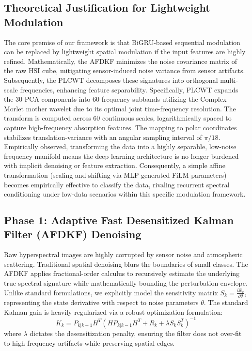 \documentclass[pdflatex,sn-mathphys-num,iicol]{sn-jnl}
\begin{document}
\subsection{Theoretical Justification for Lightweight Modulation}\label{sec:theoretical}
The core premise of our framework is that BiGRU-based sequential modulation can be replaced by lightweight spatial modulation if the input features are highly refined. Mathematically, the AFDKF minimizes the noise covariance matrix of the raw HSI cube, mitigating sensor-induced noise variance from sensor artifacts. Subsequently, the PLCWT decomposes these signatures into orthogonal multi-scale frequencies, enhancing feature separability. Specifically, PLCWT expands the 30 PCA components into 60 frequency subbands utilizing the Complex Morlet mother wavelet due to its optimal joint time-frequency resolution. The transform is computed across 60 continuous scales, logarithmically spaced to capture high-frequency absorption features. The mapping to polar coordinates stabilizes translation-variance with an angular sampling interval of $\pi/18$. Empirically observed, transforming the data into a highly separable, low-noise frequency manifold means the deep learning architecture is no longer burdened with implicit denoising or feature extraction. Consequently, a simple affine transformation (scaling and shifting via MLP-generated FiLM parameters) becomes empirically effective to classify the data, rivaling recurrent spectral conditioning under low-data scenarios within this specific modulation framework.

\subsection{Phase 1: Adaptive Fast Desensitized Kalman Filter (AFDKF) Denoising}
Raw hyperspectral images are highly corrupted by sensor noise and atmospheric scattering. Traditional spatial denoising blurs the boundaries of small classes. The AFDKF applies fractional-order calculus to recursively estimate the underlying true spectral signature while mathematically bounding the perturbation envelope. Unlike standard formulations, we explicitly model the sensitivity matrix $S_k = \frac{\partial \hat{x}_k}{\partial \theta}$, representing the state derivative with respect to noise parameters $\theta$. The standard Kalman gain is heavily regularized via a robust optimization formulation:
\begin{equation}
K_k = P_{k|k-1}H^T(HP_{k|k-1}H^T + R_k + \lambda S_k S_k^T)^{-1}
\end{equation}
where $\lambda$ dictates the desensitization penalty, ensuring the filter does not over-fit to high-frequency artifacts while preserving spatial edges.
\end{document}
